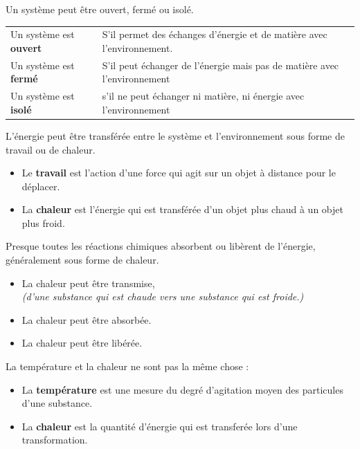\documentclass[
  11pt,
  a4paper,
  openany]{book}
\providecommand{\tightlist}{%
  \setlength{\itemsep}{0pt}\setlength{\parskip}{0pt}}
\begin{document}
Un système peut être ouvert, fermé ou isolé.

\begin{longtable}[]{@{}
  >{\raggedright\arraybackslash}p{}
  >{\raggedright\arraybackslash}p{}@{}}
\toprule()
\endhead
Un système est \textbf{ouvert} & S'il permet des échanges d'énergie et de matière avec l'environnement. \\
Un système est \textbf{fermé} & S'il peut échanger de l'énergie mais pas de matière avec l'environnement \\
Un système est \textbf{isolé} & s'il ne peut échanger ni matière, ni énergie avec l'environnement \\
\bottomrule()
\end{longtable}

L'énergie peut être transférée entre le système et l'environnement sous forme de travail ou de chaleur.

\begin{itemize}
\tightlist
\item
  Le \textbf{travail} est l'action d'une force qui agit sur un objet à distance pour le déplacer.
\item
  La \textbf{chaleur} est l'énergie qui est transférée d'un objet plus chaud à un objet plus froid.
\end{itemize}

Presque toutes les réactions chimiques absorbent ou libèrent de l'énergie, généralement sous forme de chaleur.

\begin{itemize}
\tightlist
\item
  La chaleur peut être transmise,\\
  \emph{(d'une substance qui est chaude vers une substance qui est froide.)}
\item
  La chaleur peut être absorbée.
\item
  La chaleur peut être libérée.
\end{itemize}

La température et la chaleur ne sont pas la même chose :

\begin{itemize}
\tightlist
\item
  La \textbf{température} est une mesure du degré d'agitation moyen des particules d'une substance.
\item
  La \textbf{chaleur} est la quantité d'énergie qui est transferée lors d'une transformation.
\end{itemize}
\end{document}
